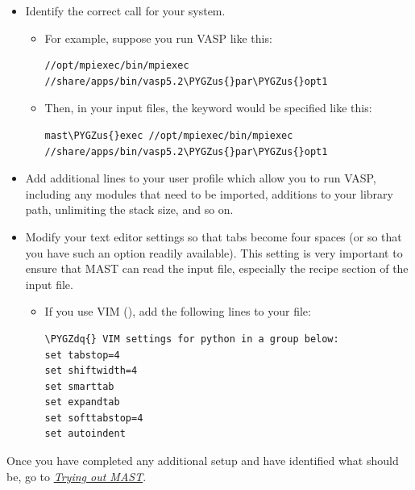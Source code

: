 \documentclass[letterpaper,10pt,english]{sphinxmanual}
\def\PYGZus{\char`\_}
\def\PYGZdq{\char`\"}
\begin{document}
\begin{itemize}
\item {} 
Identify the correct  call for your system.
\begin{itemize}
\item {} 
For example, suppose you run VASP like this:

\begin{Verbatim}[commandchars=\\\{\}]
//opt/mpiexec/bin/mpiexec //share/apps/bin/vasp5.2\PYGZus{}par\PYGZus{}opt1
\end{Verbatim}

\item {} 
Then, in your input files, the  keyword would be specified like this:

\begin{Verbatim}[commandchars=\\\{\}]
mast\PYGZus{}exec //opt/mpiexec/bin/mpiexec //share/apps/bin/vasp5.2\PYGZus{}par\PYGZus{}opt1
\end{Verbatim}

\end{itemize}

\item {} 
Add additional lines to your user profile which allow you to run VASP, including any modules that need to be imported, additions to your library path, unlimiting the stack size, and so on.

\item {} 
Modify your text editor settings so that tabs become four spaces (or so that you have such an option readily available). This setting is very important to ensure that MAST can read the input file, especially the recipe section of the input file.
\begin{itemize}
\item {} 
If you use VIM (), add the following lines to your  file:

\begin{Verbatim}[commandchars=\\\{\}]
\PYGZdq{} VIM settings for python in a group below:
set tabstop=4
set shiftwidth=4
set smarttab
set expandtab
set softtabstop=4
set autoindent
\end{Verbatim}

\end{itemize}

\end{itemize}

Once you have completed any additional setup and have identified what  should be, go to {\hyperref[17_0_testmast::doc]{\emph{Trying out MAST}}}.
\end{document}
